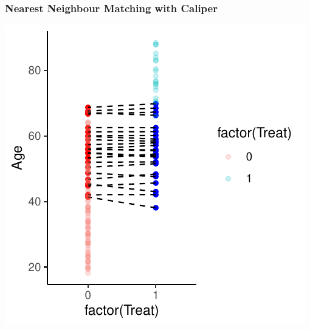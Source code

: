 \documentclass[xcolor=x11names,compress]{beamer}\usepackage[]{graphicx}\usepackage[]{color}
\makeatletter
\def\maxwidth{ %
  \ifdim\Gin@nat@width>\linewidth
    \linewidth
  \else
    \Gin@nat@width
  \fi
}
\newenvironment{knitrout}{}{} %
\renewcommand{\(}{\begin{columns}}
\renewcommand{\)}{\end{columns}}
\newcommand{\<}[1]{\begin{column}{#1}}
\renewcommand{\>}{\end{column}}
\makeatother
\begin{document}
\begin{frame}
\frametitle{Nearest Neighbour Matching with Caliper}
\begin{center}
\begin{knitrout}
\color{fgcolor}
\includegraphics[width=\maxwidth]{figure/nearest_matching_3_caliper-1} 

\end{knitrout}
\end{center}
\end{frame}
\end{document}
